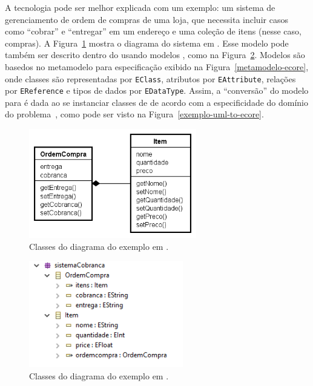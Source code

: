 A tecnologia \emf pode ser melhor explicada com um exemplo: um sistema de gerenciamento de ordem de compras de uma loja, que necessita incluir casos como ``cobrar'' e ``entregar'' em um endereço e uma coleção de itens (nesse caso, compras). A Figura~\ref{exemplo-uml} mostra o diagrama do sistema em \uml. Esse modelo pode também ser descrito dentro do \emf usando modelos \ecore, como na Figura~\ref{exemplo-ecore}. Modelos \ecore são basedos no metamodelo para especificação exibido na Figura~\ref{metamodelo-ecore}, onde classes são representadas por \texttt{EClass}, atributos por \texttt{EAttribute}, relações por \texttt{EReference} e tipos de dados por \texttt{EDataType}. Assim, a ``conversão'' do modelo \uml para \ecore é dada ao se instanciar classes de \ecore de acordo com a especificidade do domínio do problema~\cite{steinberg2008emf}, como pode ser visto na Figura~\ref{exemplo-uml-to-ecore}. 

\begin{figure}
	\centering
	\includegraphics[width=0.65\textwidth]{figuras/exemplos-emf/exemplo-uml.png}
	\caption{Classes do diagrama do exemplo em \uml.}
	\label{exemplo-uml}
\end{figure}

\begin{figure}
	\centering
	\includegraphics[width=0.6\textwidth]{figuras/exemplos-emf/exemplo-ecore.PNG}
	\caption{Classes do diagrama do exemplo em \ecore.}
	\label{exemplo-ecore}
\end{figure}

